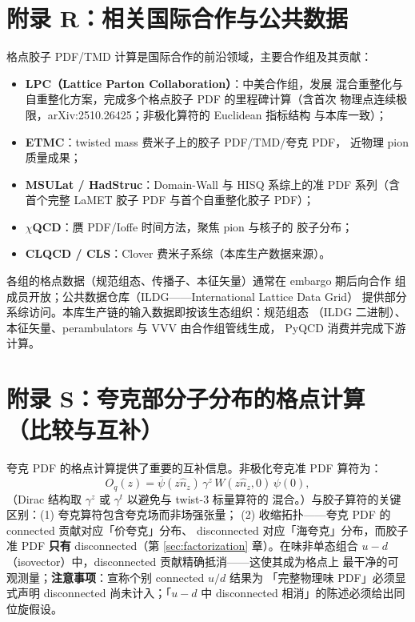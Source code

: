 \documentclass[11pt,a4paper]{ctexart}
\begin{document}
\section{附录 R：相关国际合作与公共数据}

格点胶子 PDF/TMD 计算是国际合作的前沿领域，主要合作组及其贡献：
\begin{itemize}
  \item \textbf{LPC（Lattice Parton Collaboration）}：中美合作组，发展
  混合重整化与自重整化方案，完成多个格点胶子 PDF 的里程碑计算（含首次
  物理点连续极限，arXiv:2510.26425；非极化算符的 Euclidean 指标结构
  与本库一致）；
  \item \textbf{ETMC}：twisted mass 费米子上的胶子 PDF/TMD/夸克 PDF，
  近物理 pion 质量成果；
  \item \textbf{MSULat / HadStruc}：Domain-Wall 与 HISQ 系综上的准 PDF
  系列（含首个完整 LaMET 胶子 PDF 与首个自重整化胶子 PDF）；
  \item \textbf{$\chi$QCD}：赝 PDF/Ioffe 时间方法，聚焦 pion 与核子的
  胶子分布；
  \item \textbf{CLQCD / CLS}：Clover 费米子系综（本库生产数据来源）。
\end{itemize}
各组的格点数据（规范组态、传播子、本征矢量）通常在 embargo 期后向合作
组成员开放；公共数据仓库（ILDG——International Lattice Data Grid）
提供部分系综访问。本库生产链的输入数据即按该生态组织：规范组态
（ILDG 二进制）、本征矢量、perambulators 与 VVV 由合作组管线生成，
PyQCD 消费并完成下游计算。

\section{附录 S：夸克部分子分布的格点计算（比较与互补）}

夸克 PDF 的格点计算提供了重要的互补信息。非极化夸克准 PDF 算符为：
\begin{equation}
O_q(z) = \bar\psi(z\hat n_z)\,\gamma^z\,W(z\hat n_z,0)\,\psi(0),
\end{equation}
（Dirac 结构取 $\gamma^z$ 或 $\gamma^t$ 以避免与 twist-3 标量算符的
混合。）与胶子算符的关键区别：(1) 夸克算符包含夸克场而非场强张量；
(2) 收缩拓扑——夸克 PDF 的 connected 贡献对应「价夸克」分布、
disconnected 对应「海夸克」分布，而胶子准 PDF \textbf{只有}
disconnected（第 \ref{sec:factorization} 章）。在味非单态组合
$u-d$（isovector）中，disconnected 贡献精确抵消——这使其成为格点上
最干净的可观测量；\textbf{注意事项}：宣称个别 connected $u/d$ 结果为
「完整物理味 PDF」必须显式声明 disconnected 尚未计入；「$u-d$ 中
disconnected 相消」的陈述必须给出同位旋假设。
\end{document}
